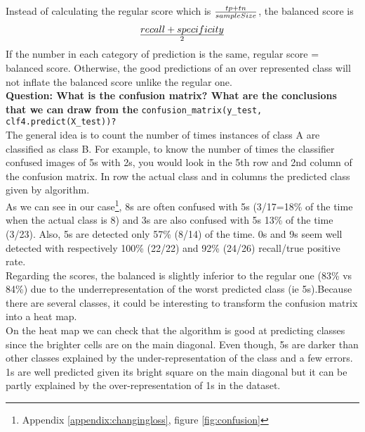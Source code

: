 Instead of calculating the regular score which is $tp+tn \over sampleSize$, the balanced score is 
\begin{equation*}
	recall+specificity \over 2
\end{equation*}
If the number in each category of prediction is the same, regular score = balanced score. Otherwise, the good predictions of an over represented class will not inflate the balanced score unlike the regular one.\\


\textbf{Question: What is the confusion matrix? What are the conclusions that we can draw from the} \verb|confusion_matrix(y_test, clf4.predict(X_test))?| \\

The general idea is to count the number of times instances of class A are classified as class B. For example, to know the number of times the classifier confused images of 5s with 2s, you would look in the 5th row and 2nd column of the confusion matrix. In row the actual class and in columns the predicted class given by algorithm. \\

As we can see in our case\footnote{Appendix \ref{appendix:changingloss}, figure \ref{fig:confusion}}, 8s are often confused with 5s (3/17=18\% of the time when the actual class is 8) and 3s are also confused with 5s 13\% of the time (3/23). Also, 5s are detected only 57\% (8/14) of the time. 0s and 9s seem well detected with respectively 100\% (22/22) and 92\% (24/26) recall/true positive rate.\\

Regarding the scores, the balanced is slightly inferior to the regular one (83\% vs 84\%) due to the underrepresentation of the worst predicted class (ie 5s).Because there are several classes, it could be interesting to transform the confusion matrix into a heat map. \\

On the heat map we can check that the algorithm is good at predicting classes since the brighter cells are on the main diagonal. Even though, 5s are darker than other classes explained by the under-representation of the class and a few errors. 1s are well predicted given its bright square on the main diagonal but it can be partly explained by the over-representation of 1s in the dataset. 


